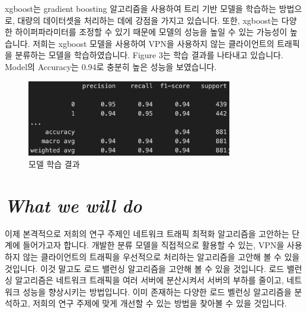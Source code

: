 \documentclass[14pt]{extarticle}
\begin{document}
xgboost는 gradient boosting 알고리즘을 사용하여 트리 기반 모델을 학습하는 방법으로, 대량의 데이터셋을 처리하는 데에 강점을 가지고 있습니다.
또한, xgboost는 다양한 하이퍼파라미터를 조정할 수 있기 때문에 모델의 성능을 높일 수 있는 가능성이 높습니다.
저희는 xgboost 모델을 사용하여 VPN을 사용하지 않는 클라이언트의 트래픽을 분류하는 모델을 학습하였습니다.
Figure 3는 학습 결과를 나타내고 있습니다. Model의 Accuracy는 0.94로 충분히 높은 성능을 보였습니다.

\begin{figure}[h!]
    \centering
    \includegraphics[width=0.8\textwidth]{Photo_Result} %
    \caption{모델 학습 결과}
\end{figure}

\section{\textit{What we will do}}
이제 본격적으로 저희의 연구 주제인 네트워크 트래픽 최적화 알고리즘을 고안하는 단계에 들어가고자 합니다.
개발한 분류 모델을 직접적으로 활용할 수 있는, VPN을 사용하지 않는 클라이언트의 트래픽을 우선적으로 처리하는 알고리즘을 고안해 볼 수 있을 것입니다.
이것 말고도 로드 밸런싱 알고리즘을 고안해 볼 수 있을 것입니다.
로드 밸런싱 알고리즘은 네트워크 트래픽을 여러 서버에 분산시켜서 서버의 부하를 줄이고, 네트워크 성능을 향상시키는 방법입니다.
이미 존재하는 다양한 로드 벨런싱 알고리즘을 분석하고, 저희의 연구 주제에 맞게 개선할 수 있는 방법을 찾아볼 수 있을 것입니다.
\end{document}
